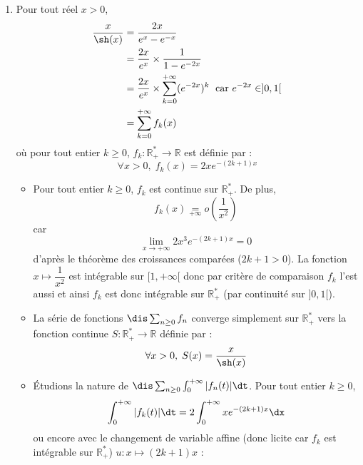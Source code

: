 \documentclass[a4paper,10pt]{report}
\begin{document}
\begin{enumerate}
\noindent On a :
$$ \dfrac{x}{\sh(x)}  \underset{+ \infty}{=} o \left( \dfrac{1}{x^2} \right)$$
car 
\begin{align*}
\dfrac{x^3}{\sh(x)} & = \dfrac{2x^3}{e^{x}-e^{-x}} \\
&  \underset{+ \infty}{\sim} \dfrac{2x^3}{e^{x}} 
\end{align*}
et d'après le théorème des croissances comparées :
$$ \lim_{x \rightarrow + \infty} \dfrac{2x^3}{e^{x}} = 0$$
L'intégrale $\dis \int_1^{+ \infty} \dfrac{1}{x^2} \dx$ est convergente (intégrale de Riemann avec $2>1$) donc par critère de comparaison (les intégrandes sont positives), on en déduit que $\dis \int_1^{+ \infty} \dfrac{x}{\sh(x)} \dx$ est convergente et ainsi $I$ converge (par fausse impropreté en $0$).
\item Pour tout réel $x>0$,
\begin{align*}
\dfrac{x}{\sh(x)} & = \dfrac{2x}{e^x-e^{-x}} \\
& = \dfrac{2x}{e^x} \times \dfrac{1}{1-e^{-2x}} \\
& =  \dfrac{2x}{e^x} \times \sum_{k=0}^{+ \infty} (e^{-2x})^k \; \hbox{ car } e^{-2x} \in ]0,1[ \\
& = \sum_{k=0}^{+ \infty} f_k(x)
\end{align*}
où pour tout entier $k \geq 0$, $f_k : \mathbb{R}_+^* \rightarrow \mathbb{R}$ est définie par :
$$ \forall x>0, \; f_k(x) = 2x e^{-(2k+1)x} $$
\begin{itemize}
\item Pour tout entier $k \geq 0$, $f_k$ est continue sur $\mathbb{R}_+^*$. De plus,
$$ f_k(x) \underset{ + \infty}{=} o \left( \dfrac{1}{x^2} \right)$$
car 
$$ \lim_{x \rightarrow + \infty} 2x^3 e^{-(2k+1)x} = 0$$
d'après le théorème des croissances comparées ($2k+1>0$). La fonction $x \mapsto \dfrac{1}{x^2}$ est intégrable sur $[1, + \infty[$ donc par critère de comparaison $f_k$ l'est aussi et ainsi $f_k$ est donc intégrable sur $\mathbb{R}_+^*$ (par continuité sur $]0,1[$). 
\item La série de fonctions $\dis \sum_{n \geq 0} f_n$ converge simplement sur $\mathbb{R}_+^*$ vers la fonction continue $S : \mathbb{R}_+^* \rightarrow \mathbb{R}$ définie par :
$$ \forall x >0, \; S(x) = \dfrac{x}{\sh(x)}$$
\item Étudions la nature de $\dis \sum_{n \geq 0} \int_{0}^{+ \infty} \vert f_n(t) \vert \dt$. Pour tout entier $k \geq 0$,
$$ \int_0^{+ \infty} \vert f_k(t) \vert \dt = 2 \int_0^{+\infty} x e^{-(2k+1)x} \dx$$
ou encore avec le changement de variable affine (donc licite car $f_k$ est intégrable sur $\mathbb{R}_+^*$) $u : x \mapsto (2k+1)x$ :

\end{itemize}
\end{enumerate}
\end{document}
